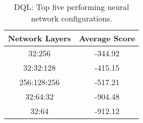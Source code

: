 \begin{table}[h]
    \centering
    \begin{tabular}{|c|c|}
    \hline
    \textbf{Network Layers} & \textbf{Average Score} \\
    \hline
    \hline
    32:256 & -344.92 \\
    \hline
    32:32:128 & -415.15 \\
    \hline
    256:128:256 & -517.21 \\
    \hline
    32:64:32 & -904.48 \\
    \hline
    32:64 & -912.12 \\
    \hline
    \end{tabular}
    \caption{DQL: Top five performing neural network configurations.}
    \label{tab:ppo_top_nn_configurations}
\end{table}
    
